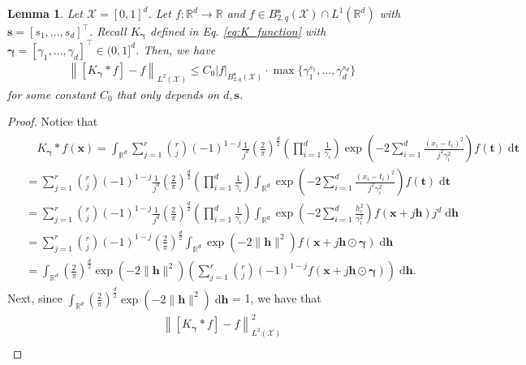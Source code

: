 \documentclass[11pt]{article}
\newcommand{\bgamma}{\boldsymbol{\gamma}}
\newcommand{\bt}{\boldsymbol{t}}
\newcommand{\bx}{\mathbf x}
\newcommand{\calX}{\mathcal{X}}
\newcommand{\x}{\mathbf{x}}
\newcommand{\R}{\mathbb{R}}
\newcommand{\0}{\mathbf{0}}
\newcommand{\bh}{\boldsymbol{h}}
\newcommand{\bs}{\boldsymbol{s}}
\newtheorem{lem}{Lemma}[section]
\begin{document}
\begin{appendix}
\begin{lem}
\label{lem:hang_prop_3}
Let $\calX = [0,1]^d$. Let $f : \R^{d} \to \R$ and $f \in B_{2,q}^{\bs}(\calX) \cap L^1(\R^d)$ with $\bs = [s_1, \ldots, s_d]^\top$. Recall $K_{\bgamma}$ defined in Eq. \eqref{eq:K_function} with $\bgamma = [\gamma_1, \ldots, \gamma_d]^\top \in (0,1]^d$.  Then, we have 
\begin{align*}
    \left\|\left[K_{\bgamma}\ast f\right] - f\right\|_{L^2(\calX)} \leq C_0 |f|_{B_{2,q}^{\bs}(\calX)} \cdot \max\{\gamma_1^{s_1}, \ldots, \gamma_d^{s_d}\} 
\end{align*}
for some constant $C_0$ that only depends on $d, \bs$. 
\end{lem}
\begin{proof}
Notice that
\begin{align*}
\begin{aligned}
&\quad K_{\bgamma} * f(\bx) =\int_{\R^d} \sum_{j=1}^r\binom{r}{j}(-1)^{1-j} \frac{1}{j^d}\left(\frac{2}{\pi}\right)^{\frac{d}{2}} \left( \prod_{i=1}^{d} \frac{1}{\gamma_i} \right) \exp\left( -2 \sum_{i=1}^d \frac{(x_i - t_i)^2}{j^2 \gamma_i^2} \right) f(\bt) \;\mathrm{d}\bt \\
& =\sum_{j=1}^r\binom{r}{j}(-1)^{1-j} \frac{1}{j^d} \left(\frac{2}{\pi}\right)^{\frac{d}{2}} \left( \prod_{i=1}^{d} \frac{1}{\gamma_i} \right) \int_{\R^d} \exp\left( -2 \sum_{i=1}^d \frac{(x_i - t_i)^2}{j^2 \gamma_i^2} \right) f(\bt) \;\mathrm{d}\bt \\
& =\sum_{j=1}^r\binom{r}{j}(-1)^{1-j} \frac{1}{j^d}\left(\frac{2}{\pi}\right)^{\frac{d}{2}} \left( \prod_{i=1}^{d} \frac{1}{\gamma_i} \right) \int_{\R^d} \exp\left( -2 \sum_{i=1}^d \frac{h_i^2}{\gamma_i^2} \right)  f(\bx + j \bh) j^d \;\mathrm{d}\bh \\
& =\sum_{j=1}^r\binom{r}{j}(-1)^{1-j} \left(\frac{2}{\pi}\right)^{\frac{d}{2}} \int_{\R^d} \exp\left( -2 \| \bh\|^2 \right)  f(\bx + j \bh \odot \bgamma) \;\mathrm{d}\bh \\
& = \int_{\R^d}\left(\frac{2}{\pi}\right)^{\frac{d}{2}} \exp\left( -2 \| \bh\|^2 \right) \left(\sum_{j=1}^r \binom{r}{j}(-1)^{1-j} f( \x + j \bh \odot \bgamma )\right) \;\mathrm{d}\bh .
\end{aligned}
\end{align*}
Next, since $\int_{\R^d} \left(\frac{2}{\pi}\right)^{\frac{d}{2}} \exp\left( -2 \| \bh\|^2 \right) \;\mathrm{d}\bh $ = 1, we have that
\begin{align*}
    &\quad \left\| [K_{\bgamma} * f] - f\right\|_{L^2(\calX)}^2 \\

\end{align*}
\end{proof}
\end{appendix}
\end{document}
